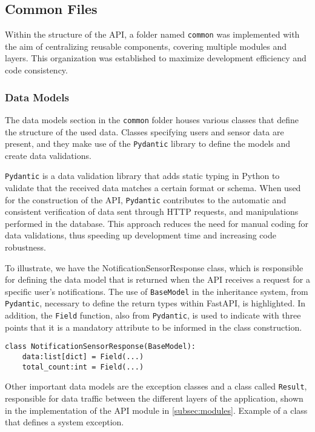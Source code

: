 \subsection{Common Files}\label{subsec:commum}

Within the structure of the \gls{API}, a folder named \texttt{common} was implemented with the aim of centralizing reusable components, covering multiple modules and layers. This organization was established to maximize development efficiency and code consistency.

\subsubsection{Data Models}\label{subsubsec:dataModel}
The data models section in the \texttt{common} folder houses various classes that define the structure of the used data. Classes specifying users and sensor data are present, and they make use of the \texttt{Pydantic} library to define the models and create data validations.

\texttt{Pydantic} \cite{pydanticDocs} is a data validation library that adds static typing in Python to validate that the received data matches a certain format or schema. When used for the construction of the \gls{API}, \texttt{Pydantic} contributes to the automatic and consistent verification of data sent through \gls{HTTP} requests, and manipulations performed in the database. This approach reduces the need for manual coding for data validations, thus speeding up development time and increasing code robustness.

To illustrate, we have the NotificationSensorResponse class, which is responsible for defining the data model that is returned when the \gls{API} receives a request for a specific user's notifications. The use of \texttt{BaseModel} in the inheritance system, from \texttt{Pydantic}, necessary to define the return types within FastAPI, is highlighted. In addition, the \texttt{Field} function, also from \texttt{Pydantic}, is used to indicate with three points that it is a mandatory attribute to be informed in the class construction.

\begin{Verbatim}[fontsize=\small, baselinestretch=0.6]
class NotificationSensorResponse(BaseModel):
    data:list[dict] = Field(...)
    total_count:int = Field(...)
\end{Verbatim}

Other important data models are the exception classes and a class called \texttt{Result}, responsible for data traffic between the different layers of the application, shown in the implementation of the \gls{API} module in \ref{subsec:modules}.
Example of a class that defines a system exception.

